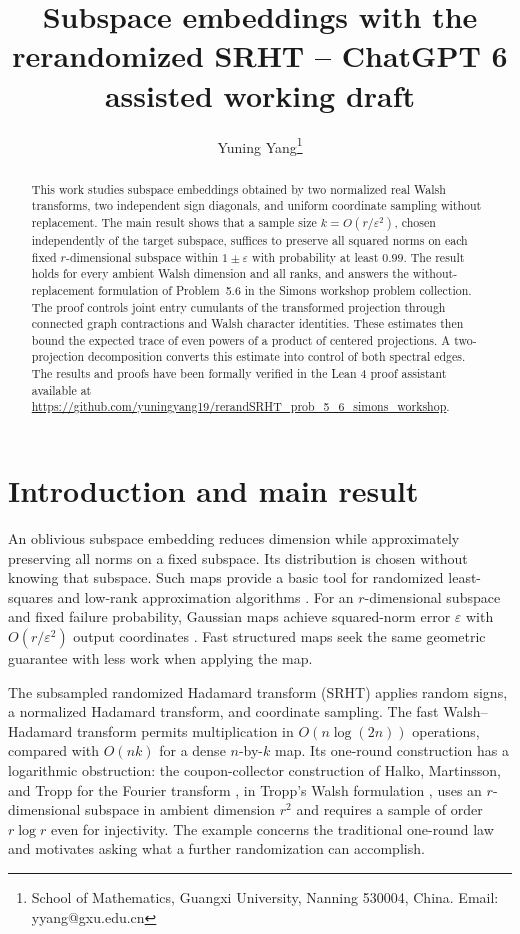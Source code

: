 \documentclass[11pt]{article}
\title{Subspace embeddings with the rerandomized SRHT -- ChatGPT 6 assisted working draft}
\author{Yuning Yang\thanks{School of Mathematics, Guangxi University, Nanning 530004, China. Email: yyang@gxu.edu.cn}}
\date{}
\theoremstyle{definition}
\theoremstyle{remark}
\theoremstyle{plain}
\begin{document}
\maketitle

\begin{abstract}
This work studies subspace embeddings obtained by two normalized real Walsh
transforms, two independent sign diagonals, and uniform coordinate
sampling without replacement. The main result shows that a sample size
$k=O(r/\varepsilon^2)$, chosen independently of the target subspace,
suffices to preserve all squared norms on each fixed $r$-dimensional
subspace within $1\pm\varepsilon$ with probability at least $0.99$.
The result holds for every ambient Walsh dimension and all ranks,
and answers the without-replacement formulation of Problem~5.6 in
the Simons workshop problem collection.
The proof controls joint entry cumulants of the transformed projection
through connected graph contractions and Walsh character identities.
These estimates then bound the expected trace of even powers of a product of
centered projections. A two-projection decomposition converts this
estimate into control of both spectral edges. The results and proofs have been formally verified in the Lean 4 proof assistant available at \url{https://github.com/yuningyang19/rerandSRHT_prob_5_6_simons_workshop}.
\end{abstract}

\section{Introduction and main result}\label{sec:introduction}

An oblivious subspace embedding reduces dimension while approximately
preserving all norms on a fixed subspace. Its distribution is chosen
without knowing that subspace. Such maps provide a basic tool for
randomized least-squares and low-rank approximation algorithms
\cite{hmt,boutsidis_gittens}. For an $r$-dimensional subspace and fixed
failure probability, Gaussian maps achieve squared-norm error
$\varepsilon$ with $O(r/\varepsilon^2)$ output coordinates
\cite[Section~1]{nelson_nguyen}.
Fast structured maps seek the same geometric guarantee with less
work when applying the map.

The subsampled randomized Hadamard transform (SRHT) applies random
signs, a normalized Hadamard transform, and coordinate sampling.
The fast Walsh--Hadamard transform permits multiplication in
$O(n\log(2n))$ operations, compared with $O(nk)$ for a dense
$n$-by-$k$ map. Its one-round construction has a logarithmic
obstruction: the coupon-collector construction of
Halko, Martinsson, and Tropp for the Fourier transform
\cite[Remark~11.2]{hmt}, in Tropp's Walsh formulation
\cite[Section~3.3]{tropp_srht}, uses an $r$-dimensional subspace in ambient dimension $r^2$
and requires a sample of order $r\log r$ even for injectivity.
The example concerns the traditional one-round law and motivates
asking what a further randomization can accomplish.
\end{document}

